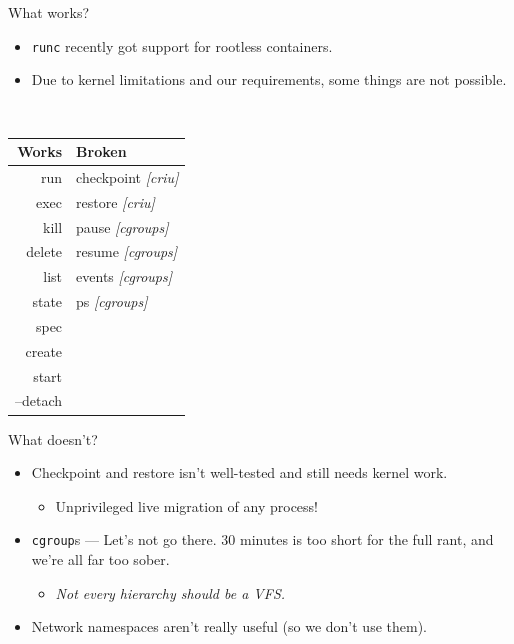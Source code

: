 \documentclass[10pt,aspectratio=169]{beamer}
\begin{document}
	\begin{frame}{What works?}
		\begin{itemize}
		    \item \texttt{runc} recently got support for rootless containers.
		    \item Due to kernel limitations and our requirements, some things are not possible.
		\end{itemize}

		\vfill

		\begin{center}
			\tt
			\begin{tabular}{rl}
				\textnormal{Works} & \textnormal{Broken} \\
				\toprule
				run & checkpoint \textit{\textnormal{[criu]}}\\
				exec & restore \textit{\textnormal{[criu]}} \\
				kill & pause \textit{\textnormal{[cgroups]}} \\
				delete & resume \textit{\textnormal{[cgroups]}} \\
				list & events \textit{\textnormal{[cgroups]}} \\
				state & ps \textit{\textnormal{[cgroups]}} \\
				spec & \\
				create & \\
				start & \\
				--detach & \\
			\end{tabular}
		\end{center}
	\end{frame}

	\begin{frame}{What doesn't?}
	    \begin{itemize}
	        \item Checkpoint and restore isn't well-tested and still needs kernel work.
	        \begin{itemize}
	            \item Unprivileged live migration of any process!
	        \end{itemize}
	        \item \texttt{cgroup}s --- Let's not go there. $30$ minutes is too short for the full rant, and we're all far too sober.
	        \begin{itemize}
	            \item \textit{Not every hierarchy should be a VFS.}
	        \end{itemize}
	        \item Network namespaces aren't really useful (so we don't use them).
	    \end{itemize}
	\end{frame}
\end{document}
